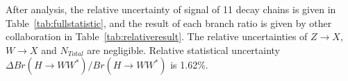 \documentclass[11pt,a4paper]{cepcnote}
\begin{document}
After analysis, the relative uncertainty of signal of 11 decay chains is given in Table~\ref{tab:fullstatistic}, 
and the result of each branch ratio is given by other collaboration in Table~\ref{tab:relativeresult}. 
The relative uncertainties of $Z\rightarrow X$, $W\rightarrow X$ and $N_{Total}$ are negligible. 
Relative statistical uncertainty $\Delta{Br(H\rightarrow WW^*)}/Br(H\rightarrow WW^*)$ is 1.62\%.

%

%
%
%
\end{document}
